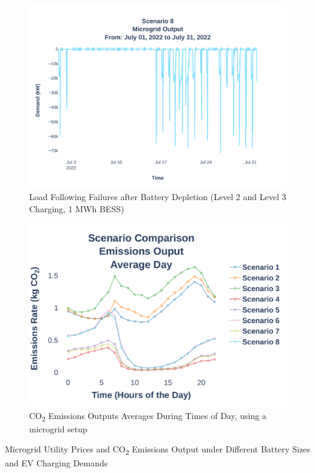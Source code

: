 \documentclass[conference]{IEEEtran}
\begin{document}
\begin{figure}[H]
	\centering
	\includegraphics[width=\linewidth]{Fig/Option_3/4_Scenario_8_Run_3_Mg_Output_Jul_01_2022_to_Jul_31_2022.pdf}
	\caption{\footnotesize Load Following Failures after Battery Depletion (Level 2 and Level 3 Charging, 1 MWh BESS)}
	\label{fig:scenario4peakshaving}
\end{figure}
	\begin{figure}[H]
		\centering
		\includegraphics[width=1\linewidth]{Fig/Option_3/emissions_scenario_comparison_run_3_large_font.pdf}
		\caption{\footnotesize  CO\textsubscript{2} Emissions Outputs Averages During Times of Day, using a microgrid setup}
		\label{fig:emissionsscenariocomparison}
	\end{figure}
	\begin{table}
		\caption{Microgrid Utility Prices and CO\textsubscript{2} Emissions Output under Different Battery Sizes and EV Charging Demands}
		\large
		\centering
		
		\normalsize
		\label{tab:emissions}
	\end{table}	
\end{document}
